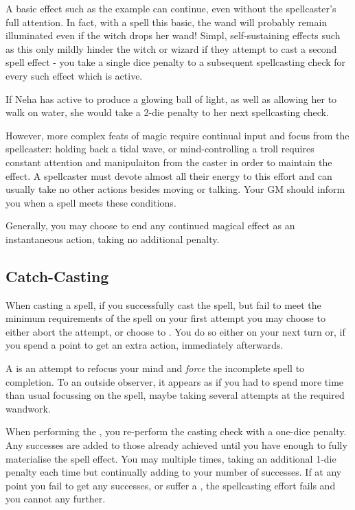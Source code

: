 A basic effect such as the  example can continue, even without the spellcaster's full attention. In fact, with a spell this basic, the wand will probably remain illuminated even if the witch drops her wand! Simpl, self-sustaining effects such as this only mildly hinder the witch or wizard if they attempt to cast a second spell effect - you take a single dice penalty to a subsequent spellcasting check for every such effect which is active. 

If Neha has  active to produce a glowing ball of light, as well as  allowing her to walk on water, she would take a 2-die penalty to her next spellcasting check. 

However, more complex feats of magic require continual input and focus from the spellcaster: holding back a tidal wave, or mind-controlling a troll requires constant attention and manipulaiton from the caster in order to maintain the effect. A spellcaster must devote almost all their energy to this effort and can usually take no other actions besides moving or talking. Your GM should inform you when a spell meets these conditions. 

Generally, you may choose to end any continued magical effect as an instantaneous action, taking no additional penalty. 

\subsection{Catch-Casting}

When casting a spell, if you successfully cast the spell, but fail to meet the minimum requirements of the spell on your first attempt you may choose to either abort the attempt, or choose to . You do so either on your next turn or, if you spend a  point to get an extra action, immediately afterwards. 

A  is an attempt to refocus your mind and {\it force} the incomplete spell to completion. To an outside observer, it appears as if you had to spend more time than usual focussing on the spell, maybe taking several attempts at the required wandwork. 

When performing the , you re-perform the casting check with a one-dice penalty. Any successes are added to those already achieved until you have enough to fully materialise the spell effect. You may  multiple times, taking an additional 1-die penalty each time but continually adding to your number of successes. If at any point you fail to get any successes, or suffer a , the spellcasting effort fails and you cannot  any further.

